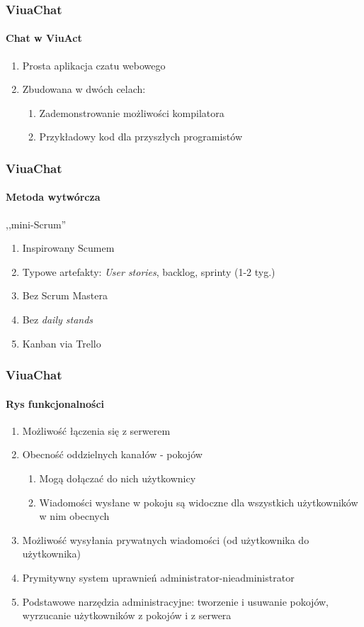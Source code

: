 \documentclass{beamer}
\begin{document}
\begin{frame}
    \frametitle{ViuaChat}
    \framesubtitle{Chat w ViuAct}

    \begin{enumerate}
        \item Prosta aplikacja czatu webowego
        \item Zbudowana w dwóch celach:
        \begin{enumerate}
        	\item Zademonstrowanie możliwości kompilatora
        	\item Przykładowy kod dla przyszłych programistów
        \end{enumerate}
    \end{enumerate}
\end{frame}

\begin{frame}
    \frametitle{ViuaChat}
    \framesubtitle{Metoda wytwórcza}

	,,mini-Scrum''
    \begin{enumerate}
        \item Inspirowany Scumem
        \item Typowe artefakty: \textit{User stories}, backlog, sprinty (1-2 tyg.)
        \item Bez Scrum Mastera
        \item Bez \textit{daily stands}
        \item Kanban via Trello
    \end{enumerate}
\end{frame}

\begin{frame}
    \frametitle{ViuaChat}
    \framesubtitle{Rys funkcjonalności}

    \begin{enumerate}
        \item Możliwość łączenia się z serwerem
        \item Obecność oddzielnych kanałów - pokojów
        \begin{enumerate}
        	\item Mogą dołączać do nich użytkownicy
        	\item Wiadomości wysłane w pokoju są widoczne dla wszystkich użytkowników w nim obecnych
        \end{enumerate}
        \item Możliwość wysyłania prywatnych wiadomości (od użytkownika do użytkownika)
		\item Prymitywny system uprawnień administrator-nieadministrator
		\item Podstawowe narzędzia administracyjne: tworzenie i usuwanie pokojów, wyrzucanie użytkowników z pokojów i z serwera
    \end{enumerate}
\end{frame}
\end{document}
